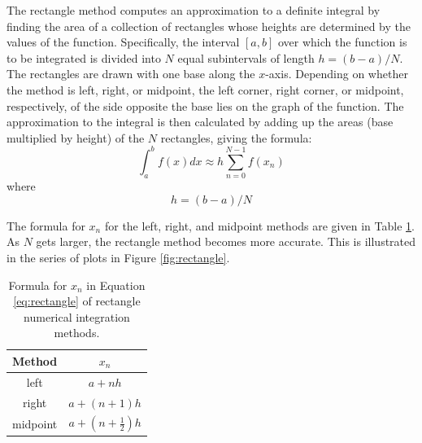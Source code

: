 \label{Rectangle_Integration}

The rectangle method computes an approximation to a 
definite integral by finding the area of a collection of rectangles whose heights are determined 
by the values of the function.  Specifically, the interval $[a,b]$ over which the function is to 
be integrated is divided into $N$ equal subintervals of length $h = (b-a)/N$. The rectangles are 
drawn with one base along the $x$-axis. Depending on whether the method is left, right, or midpoint,
the left corner, right corner, or midpoint, respectively, of the side opposite the base lies on the 
graph of the function. The approximation to the integral is 
then calculated by adding up the areas (base multiplied by height) of the $N$ rectangles, 
giving the formula:
\begin{equation}
\int_a^b f(x) dx \approx h \sum_{n=0}^{N-1} f(x_n) \label{eq:rectangle}
\end{equation}
where
\begin{equation}
  h=(b-a)/N  \label{eq:subinterval-width}
\end{equation}

The formula for $x_n$ for the left, right, and midpoint methods are given in Table \ref{tab:xn-rectangle}.
As $N$ gets larger, the rectangle method becomes more accurate. This is illustrated in the series of plots
in Figure \ref{fig:rectangle}.

\begin{table}[htbp]
\centering
\caption{Formula for $x_n$ in Equation \ref{eq:rectangle} of 
rectangle numerical integration methods.} 
\label{tab:xn-rectangle}
\begin{tabular}{cc}
\textbf{Method} & \textbf{$x_n$} \\ \toprule
left & $a+nh$ \\ \midrule
right & $a+(n+1)h$ \\ \midrule
midpoint & $a+\left(n + \frac{1}{2}\right)h$ \\ \bottomrule
\end{tabular}
\end{table}

